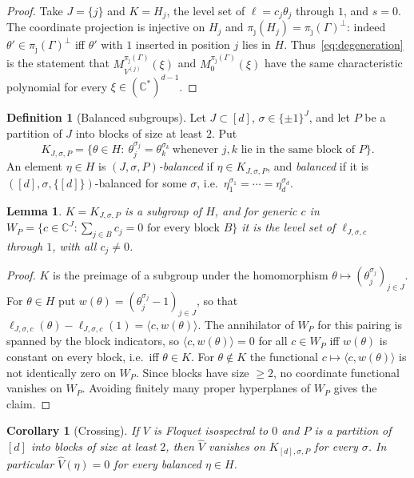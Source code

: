 \documentclass[11pt,reqno]{amsart}
\newtheorem{lemma}[theorem]{Lemma}
\newtheorem{corollary}[theorem]{Corollary}
\theoremstyle{definition}
\newtheorem{definition}[theorem]{Definition}
\theoremstyle{remark}
\newcommand{\C}{\mathbb C}
\begin{document}
\begin{proof}
Take $J=\{j\}$ and $K=H_j$, the level set of $\ell=c_j\theta_j$ through $1$, and
$s=0$.  The coordinate projection is injective on $H_j$ and
$\pi_{\hat\jmath}(H_j)=\pi_{\hat\jmath}(\Gamma)^\perp$: indeed
$\theta'\in\pi_{\hat\jmath}(\Gamma)^\perp$ iff $\theta'$ with $1$ inserted in
position $j$ lies in $H$.  Thus~\eqref{eq:degeneration} is the statement that
$M^{\pi_{\hat\jmath}(\Gamma)}_{V^{(j)}}(\xi)$ and
$M^{\pi_{\hat\jmath}(\Gamma)}_0(\xi)$ have the same characteristic polynomial for
every $\xi\in(\C^*)^{d-1}$.
\end{proof}

\begin{definition}[Balanced subgroups]\label{def:balanced}
Let $J\subset[d]$, $\sigma\in\{\pm1\}^J$, and let $P$ be a partition of $J$ into
blocks of size at least $2$.  Put
\[
 K_{J,\sigma,P}=\{\theta\in H:\ \theta_j^{\sigma_j}=\theta_k^{\sigma_k}\ \text{whenever $j,k$ lie in the same block of }P\}.
\]
An element $\eta\in H$ is \emph{$(J,\sigma,P)$-balanced} if $\eta\in K_{J,\sigma,P}$,
and \emph{balanced} if it is $([d],\sigma,\{[d]\})$-balanced for some $\sigma$,
i.e.\ $\eta_1^{\sigma_1}=\cdots=\eta_d^{\sigma_d}$.
\end{definition}

\begin{lemma}\label{lem:balanced-levelset}
$K=K_{J,\sigma,P}$ is a subgroup of $H$, and for generic $c$ in
$W_P=\{c\in\C^J:\sum_{j\in B}c_j=0\text{ for every block }B\}$ it is the level
set of $\ell_{J,\sigma,c}$ through $1$, with all $c_j\ne0$.
\end{lemma}

\begin{proof}
$K$ is the preimage of a subgroup under the homomorphism $\theta\mapsto(\theta_j^{\sigma_j})_{j\in J}$.
For $\theta\in H$ put $w(\theta)=(\theta_j^{\sigma_j}-1)_{j\in J}$, so that
$\ell_{J,\sigma,c}(\theta)-\ell_{J,\sigma,c}(1)=\langle c,w(\theta)\rangle$.  The
annihilator of $W_P$ for this pairing is spanned by the block indicators, so
$\langle c,w(\theta)\rangle=0$ for all $c\in W_P$ iff $w(\theta)$ is constant on
every block, i.e.\ iff $\theta\in K$.  For $\theta\notin K$ the functional
$c\mapsto\langle c,w(\theta)\rangle$ is not identically zero on $W_P$.  Since
blocks have size $\ge2$, no coordinate functional vanishes on $W_P$.  Avoiding
finitely many proper hyperplanes of $W_P$ gives the claim.
\end{proof}

\begin{corollary}[Crossing]\label{cor:crossing}
If $V$ is Floquet isospectral to $0$ and $P$ is a partition of $[d]$ into blocks
of size at least $2$, then $\widehat V$ vanishes on $K_{[d],\sigma,P}$ for every
$\sigma$.  In particular $\widehat V(\eta)=0$ for every balanced $\eta\in H$.
\end{corollary}
\end{document}
